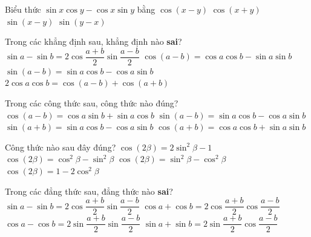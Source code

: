 \begin{ex}%
	Biểu thức $\sin x \cos y-\cos x \sin y$ bằng 
	\choice 
		{$\cos  (x-y)$}
		{$\cos (x+y)$} 
		 {\True $\sin (x-y)$}
		{$\sin  (y-x)$}
\end{ex}

\begin{ex}%
	Trong các khẳng định  sau, khẳng định nào \textbf{sai}?
	 \choice
		{$\sin a-\sin b=2  \cos \dfrac{a+b}{2} \sin \dfrac{a-b}{2}$}
		{\True $\cos (a-b)=\cos a \cos b-\sin a \sin b$} 
		{$\sin (a-b)=\sin  a \cos b-\cos a \sin b$}
		{$2 \cos a  \cos b=\cos (a-b)+\cos (a+b)$}
\end{ex}

\begin{ex}%
	Trong các công thức sau, công  thức nào đúng?
	 \choice
		{$\cos (a-b)=\cos a\sin b+\sin  a\cos b$}
		{\True $\sin (a-b) =  \sin a\cos b - \cos a\sin b$}
		{$\sin (a+b) = \sin a\cos b - \cos a\sin b$} 
		{$\cos (a+b)=\cos a\cos b+\sin a\sin  b$}
\end{ex}

\begin{ex}%
	Công thức nào sau đây  đúng?
	 \choice
		{$\cos(2\beta)=2\sin^2\beta-1$} 
		 {\True $\cos(2\beta)=\cos^2\beta-\sin^2\beta$}
		{$\cos(2\beta)=\sin^2\beta-\cos^2\beta$} 
		{$\cos(2\beta)=1-2\cos^2\beta$} 
\end{ex}

\begin{ex}%
	Trong các đẳng  thức sau, đẳng thức nào \textbf{sai}?
	\choice 
		{$\sin  a-\sin b=2 \cos \dfrac{a+b}{2}\sin \dfrac{a-b}{2}$}
		{$\cos a+\cos b=2 \cos \dfrac{a+b}{2}\cos  \dfrac{a-b}{2}$}
		{\True $\cos a-\cos b=2 \sin \dfrac{a+b}{2}\sin \dfrac{a-b}{2}$} 
		{$\sin  a+\sin b=2 \sin \dfrac{a+b}{2}\cos \dfrac{a-b}{2}$}
\end{ex}

